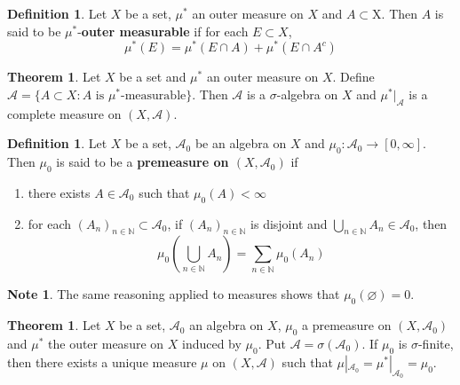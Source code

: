 \documentclass[12pt]{amsart}
\theoremstyle{definition}
\newtheorem{defn}[definition]{Definition}
\newtheorem{note}[definition]{Note}
\newtheorem{thm}[definition]{Theorem}
\newcommand{\sig}{\sigma}
\newcommand{\N}{\mathbb{N}}
\newcommand{\MA}{\mathcal{A}}
\newcommand{\ld}[1]{\label{defn:#1}}
\begin{document}
	\begin{defn} \ld{00000} 
		Let $X$ be a set, $\mu^*$ an outer measure on $X$ and $A \subset $X. Then $A$ is said to be $\mu^*$-\textbf{outer measurable} if for each $E \subset X$, $$\mu^*(E) = \mu^*(E \cap A) + \mu^*(E \cap A^c)$$ 
	\end{defn}
	
	\begin{thm}
		Let $X$ be a set and $\mu^*$ an outer measure on $X$. Define $\MA = \{A \subset X: A \text{ is }\mu^*\text{-measurable}\}$. Then $\MA$ is a $\sig$-algebra on $X$ and $\mu^*|_{\MA}$ is a complete measure on $(X, \MA)$.
	\end{thm}
	
	\begin{defn} \ld{00000} 
		Let $X$ be a set, $\MA_0$ be an algebra on $X$ and $\mu_0:\MA_0 \rightarrow [0, \infty]$. Then $\mu_0$ is said to be a \textbf{premeasure on $(X,\MA_0)$} if 
		\begin{enumerate}
			\item there exists $A \in \MA_0$ such that $\mu_0(A)< \infty$
			\item for each $(A_n)_{n \in \N} \subset \MA_0$, if $(A_n)_{n \in \N}$ is disjoint and $\bigcup\limits_{n \in \N}A_n \in \MA_0$, then $$\mu_0(\bigcup_{n\in \N}A_n) = \sum_{n \in \N}\mu_0(A_n)$$
		\end{enumerate}
	\end{defn}
	
	\begin{note}
		The same reasoning applied to measures shows that $\mu_0(\varnothing) = 0$.
	\end{note}
	
	\begin{thm}
		Let $X$ be a set, $\MA_0$ an algebra on $X$, $\mu_0$ a premeasure on $(X,\MA_0)$ and $\mu^*$ the outer measure on $X$ induced by $\mu_0$. Put $\MA = \sig(\MA_0)$. If $\mu_0$ is $\sig$-finite, then there exists a unique measure $\mu$ on $(X, \MA)$ such that $\mu|_{\MA_0} = \mu^*|_{\MA_0} = \mu_0$. 
	\end{thm}
	
	
	
	
	
	
	
	
	
	
	
	
	
	
	
	
	
	
	
	
	
\end{document}
